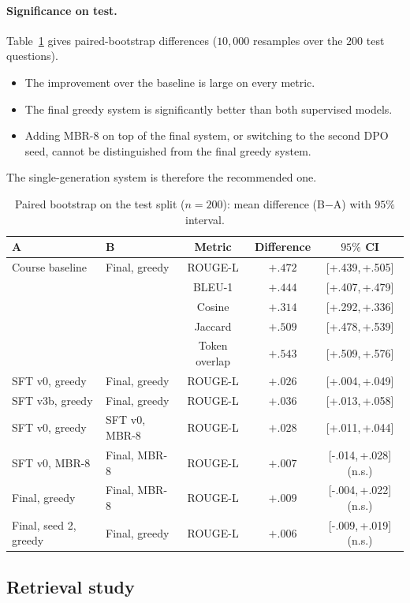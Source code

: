 \documentclass[11pt,a4paper]{article}
\newcommand{\rl}{ROUGE-L}
\newcommand{\ci}[2]{{\scriptsize[#1,\,#2]}}
\begin{document}
\paragraph{Significance on test.}
Table~\ref{tab:testboot} gives paired-bootstrap differences ($10{,}000$ resamples over the $200$ test questions).
\begin{itemize}[leftmargin=*]
\item The improvement over the baseline is large on every metric.
\item The final greedy system is significantly better than both supervised models.
\item Adding MBR-8 on top of the final system, or switching to the second DPO seed, cannot be distinguished from the final greedy system.
\end{itemize}
The single-generation system is therefore the recommended one.
\begin{table}[H]
\centering
\caption{Paired bootstrap on the test split ($n{=}200$): mean difference (B$-$A) with $95\%$ interval.}\label{tab:testboot}
\begin{tabular}{@{}llccc@{}}
\toprule
A & B & Metric & Difference & $95\%$ CI\\
\midrule
Course baseline & Final, greedy & \rl{} & $+.472$ & \ci{+.439}{+.505}\\
 & & BLEU-1 & $+.444$ & \ci{+.407}{+.479}\\
 & & Cosine & $+.314$ & \ci{+.292}{+.336}\\
 & & Jaccard & $+.509$ & \ci{+.478}{+.539}\\
 & & Token overlap & $+.543$ & \ci{+.509}{+.576}\\
SFT v0, greedy & Final, greedy & \rl{} & $+.026$ & \ci{+.004}{+.049}\\
SFT v3b, greedy & Final, greedy & \rl{} & $+.036$ & \ci{+.013}{+.058}\\
SFT v0, greedy & SFT v0, MBR-8 & \rl{} & $+.028$ & \ci{+.011}{+.044}\\
SFT v0, MBR-8 & Final, MBR-8 & \rl{} & $+.007$ & \ci{-.014}{+.028} (n.s.)\\
Final, greedy & Final, MBR-8 & \rl{} & $+.009$ & \ci{-.004}{+.022} (n.s.)\\
Final, seed 2, greedy & Final, greedy & \rl{} & $+.006$ & \ci{-.009}{+.019} (n.s.)\\
\bottomrule
\end{tabular}
\end{table}

\subsection{Retrieval study}\label{sec:retrieval}
\end{document}
